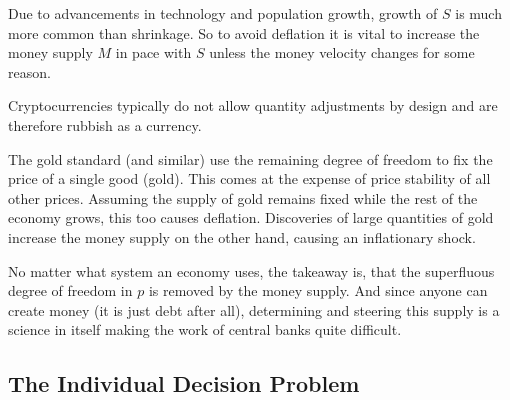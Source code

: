 Due to advancements in technology and population growth, growth of \(S\) is much
more common than shrinkage.  So to avoid deflation it is vital to increase
the money supply \(M\) in pace with \(S\) unless the money velocity changes for
some reason.

Cryptocurrencies typically do not allow quantity adjustments by design and are
therefore rubbish as a currency.

The gold standard (and similar) use the remaining degree of freedom to fix the
price of a single good (gold). This comes at the expense of price stability
of all other prices. Assuming the supply of gold remains fixed while the rest
of the economy grows, this too causes deflation. Discoveries of large quantities
of gold increase the money supply on the other hand, causing an inflationary
shock.

No matter what system an economy uses, the takeaway is, that the superfluous
degree of freedom in \(p\) is removed by the money supply. And since anyone can
create money (it is just debt after all), determining and steering this supply
is a science in itself making the work of central banks quite difficult.

\subsection{The Individual Decision Problem}

